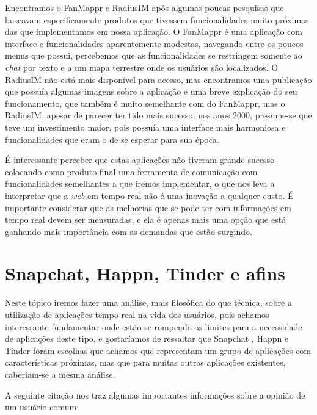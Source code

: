 Encontramos o FanMappr e RadiusIM após algumas poucas pesquisas que buscavam especificamente produtos que tivessem funcionalidades muito próximas das que implementamos em nossa aplicação. O FanMappr é uma aplicação com interface e funcionalidades aparentemente modestas, navegando entre os poucos menus que possui, percebemos que as funcionalidades se restringem somente ao \textit{chat} por texto e a um mapa terrestre onde os usuários são localizados. O RadiusIM não está mais disponível para acesso, mas encontramos uma publicação \cite{radiusim} que possuía algumas imagens sobre a aplicação e uma breve explicação do seu funcionamento, que também é muito semelhante com do FanMappr, mas o RadiusIM, apesar de parecer ter tido mais sucesso, nos anos 2000, presume-se que teve um investimento maior, pois possuía uma interface mais harmoniosa e funcionalidades que eram o de se esperar para sua época.

É interessante perceber que estas aplicações não tiveram grande sucesso colocando como produto final uma ferramenta de comunicação com funcionalidades semelhantes a que iremos implementar, o que nos leva a interpretar que a \textit{web} em tempo real não é uma inovação a qualquer custo. É importante considerar que as melhorias que se pode ter com informações em tempo real devem ser mensuradas, e ela é apenas mais uma opção que está ganhando mais importância com as demandas que estão surgindo.

\section{Snapchat, Happn, Tinder e afins}
Neste tópico iremos fazer uma análise, mais filosófica do que técnica, sobre a utilização de aplicações tempo-real na vida dos usuários, pois achamos interessante fundamentar onde estão se rompendo os limites para a necessidade de aplicações deste tipo, e gostaríamos de ressaltar que Snapchat \cite{snapchat}, Happn \cite{happn} e Tinder \cite{tinder} foram escolhas que achamos que representam um grupo de aplicações com características próximas, mas que para muitas outras aplicações existentes, caberiam-se a mesma análise.

A seguinte citação \cite{notnotcitricsquid} nos traz algumas importantes informações sobre a opinião de um usuário comum:

